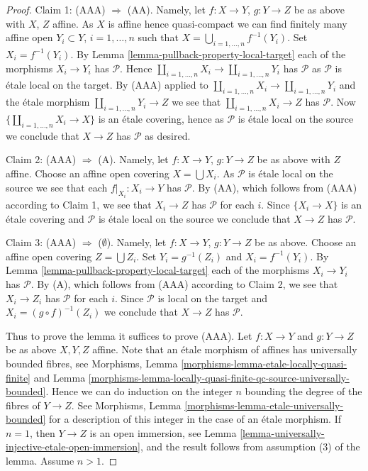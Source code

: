 \begin{proof}
\medskip\noindent
Claim 1: (AAA) $\Rightarrow$ (AA).
Namely, let $f : X \to Y$, $g : Y \to Z$ be as above with $X$, $Z$ affine.
As $X$ is affine hence quasi-compact we can find finitely many
affine open $Y_i \subset Y$, $i = 1, \ldots, n$ such that
$X = \bigcup_{i = 1, \ldots, n} f^{-1}(Y_i)$. Set $X_i = f^{-1}(Y_i)$. By
Lemma \ref{lemma-pullback-property-local-target}
each of the morphisms $X_i \to Y_i$ has $\mathcal{P}$.
Hence $\coprod_{i = 1, \ldots, n} X_i \to \coprod_{i = 1, \ldots, n} Y_i$
has $\mathcal{P}$ as $\mathcal{P}$ is \'etale local on the target.
By (AAA) applied to
$\coprod_{i = 1, \ldots, n} X_i \to \coprod_{i = 1, \ldots, n} Y_i$
and the \'etale morphism $\coprod_{i = 1, \ldots, n} Y_i \to Z$
we see that $\coprod_{i = 1, \ldots, n} X_i \to Z$ has $\mathcal{P}$.
Now $\{\coprod_{i = 1, \ldots, n} X_i \to X\}$ is an \'etale
covering, hence as $\mathcal{P}$ is \'etale local on the source
we conclude that $X \to Z$ has $\mathcal{P}$ as desired.

\medskip\noindent
Claim 2: (AAA) $\Rightarrow$ (A).
Namely, let $f : X \to Y$, $g : Y \to Z$ be as above with $Z$ affine.
Choose an affine open covering $X = \bigcup X_i$.
As $\mathcal{P}$ is \'etale local on the source we see that
each $f|_{X_i} : X_i \to Y$ has $\mathcal{P}$.
By (AA), which follows from (AAA) according to Claim 1, we see that
$X_i \to Z$ has $\mathcal{P}$ for each $i$.
Since $\{X_i \to X\}$ is an \'etale covering and $\mathcal{P}$ is \'etale
local on the source we conclude that
$X \to Z$ has $\mathcal{P}$.

\medskip\noindent
Claim 3: (AAA) $\Rightarrow$ ($\emptyset$).
Namely, let $f : X \to Y$, $g : Y \to Z$ be as above.
Choose an affine open covering $Z = \bigcup Z_i$.
Set $Y_i = g^{-1}(Z_i)$ and $X_i = f^{-1}(Y_i)$. By
Lemma \ref{lemma-pullback-property-local-target}
each of the morphisms $X_i \to Y_i$ has $\mathcal{P}$.
By (A), which follows from (AAA) according to Claim 2, we see that
$X_i \to Z_i$ has $\mathcal{P}$ for each $i$.
Since $\mathcal{P}$ is local on the target and $X_i = (g \circ f)^{-1}(Z_i)$
we conclude that $X \to Z$ has $\mathcal{P}$.

\medskip\noindent
Thus to prove the lemma it suffices to prove (AAA).
Let $f : X \to Y$ and $g : Y \to Z$ be as above $X, Y, Z$ affine.
Note that an \'etale morphism of affines has universally bounded fibres, see
Morphisms,
Lemma \ref{morphisms-lemma-etale-locally-quasi-finite} and
Lemma \ref{morphisms-lemma-locally-quasi-finite-qc-source-universally-bounded}.
Hence we can do induction on the integer $n$ bounding the degree of the fibres
of $Y \to Z$. See
Morphisms, Lemma \ref{morphisms-lemma-etale-universally-bounded}
for a description of this integer in the case of an \'etale morphism.
If $n = 1$, then $Y \to Z$ is an open immersion, see
Lemma \ref{lemma-universally-injective-etale-open-immersion},
and the result follows from assumption (3) of the lemma. Assume $n > 1$.


\end{proof}

